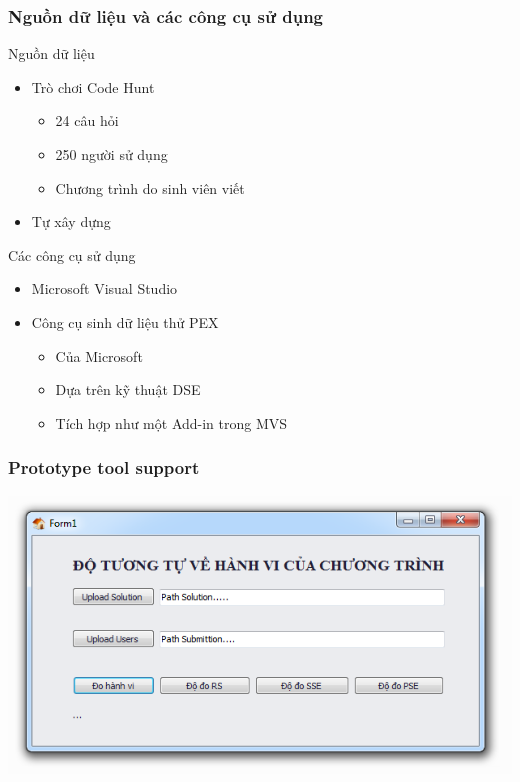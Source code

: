 \documentclass{beamer}
\begin{document}
\begin{frame}
  \frametitle{Nguồn dữ liệu và các công cụ sử dụng}
  \begin{block}{Nguồn dữ liệu}
    \begin{itemize}
    \item Trò chơi Code Hunt
      \begin{itemize}
      \item 24 câu hỏi
      \item 250 người sử dụng
      \item Chương trình do sinh viên viết
      \end{itemize}
    \item Tự xây dựng
    \end{itemize}
  \end{block} \pause
  \begin{block}{Các công cụ sử dụng}
    \begin{itemize}
    \item Microsoft Visual Studio
    \item Công cụ sinh dữ liệu thử PEX
      \begin{itemize}
      \item Của Microsoft
      \item Dựa trên kỹ thuật DSE
      \item Tích hợp như một Add-in trong MVS
      \end{itemize}
    \end{itemize}
  \end{block}
\end{frame}

\begin{frame}
  \frametitle{Prototype tool support}
  \centering
  \includegraphics[width=\linewidth]{images/main.png}
  
\end{frame}
\end{document}
